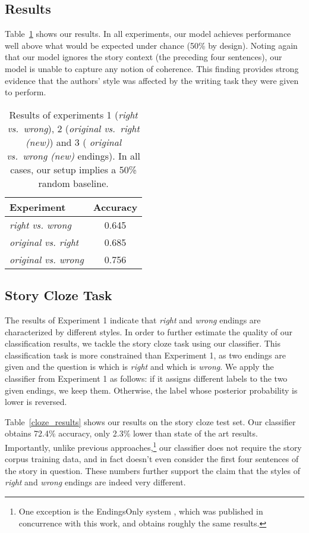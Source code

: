\documentclass[11pt,a4paper]{article}
\newcommand{\tabref}[1]{Table~\ref{#1}}
\newcommand{\isubsectionb}[1]{\subsection{#1}\label{ssec:#1}}
\begin{document}
\isubsectionb{Results}
\tabref{results} shows our results.  In all experiments,
our model achieves performance well above what would be expected under
chance (50\% by design).  Noting again that our model ignores the
story context (the preceding four sentences), our model is unable to
capture any notion of coherence.   This finding provides
strong evidence that the authors' style was affected by the writing task they
were given to perform.



\begin{table}[!t]
\begin{center}
\begin{tabular}{|l|c|} \hline
{\bf Experiment} & {\bf Accuracy} \\ \hline
{\sl right vs. wrong} & 0.645 \\ \hline
{\sl original vs. right} & 0.685 \\ \hline
{\sl original vs. wrong} & 0.756 \\ \hline
\end{tabular}
\end{center}
\caption{\label{results}Results of  experiments 1 ({\it right vs.~wrong}), 2 ({\it original vs.~right (new)}) and 3 ({\it
  original vs.~wrong (new)} endings).
In all cases, our setup implies a 50\% random baseline.}
\end{table}

\subsection{Story Cloze Task}
The results of Experiment 1 indicate that {\it right} and {\it wrong} endings are characterized by different styles.
In order to further estimate the quality of our classification results, we tackle the story cloze task using our classifier.
This classification task is more constrained than Experiment 1, as two
endings are given and the question is which is \emph{right} and which is
\emph{wrong}.
We apply the classifier from Experiment 1 as follows:
if it assigns different labels to the two given endings, we keep
them.  Otherwise, the label whose posterior probability is lower is reversed.

\tabref{cloze_results} shows our results on the story cloze test
set. Our classifier obtains 72.4\% accuracy, only 2.3\% lower than state of the art results.
Importantly, unlike previous approaches,\footnote{One exception is the  EndingsOnly system \cite{Cai:2017}, which was published in concurrence with this work, and obtains roughly the same results.} our classifier does not require the story corpus training data, and in fact doesn't even consider the first four sentences of the story in question.
These numbers further support the claim that the styles of {\it right} and {\it wrong} endings are indeed very different.
\end{document}
